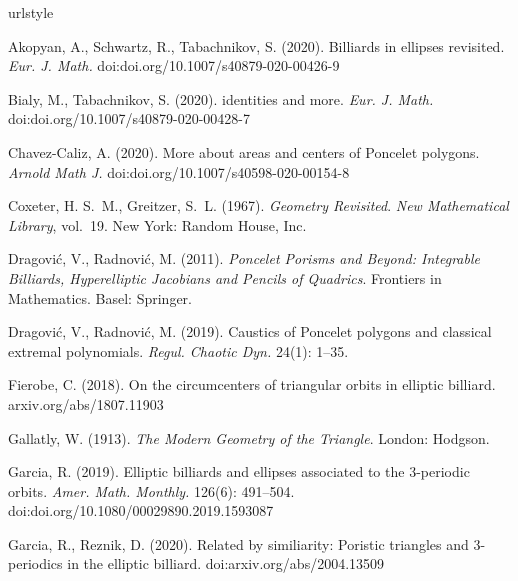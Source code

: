 \documentclass{amsart}
\theoremstyle{definition}
\begin{document}


\begin{thebibliography}{10}
\expandafter\ifx\csname urlstyle\endcsname\relax
 \providecommand{\url}[1]{doi:\discretionary{}{}{}#1}\else
 \providecommand{\url}{doi:\discretionary{}{}{}\begingroup
  \urlstyle{rm}\Url}\fi

Akopyan, A., Schwartz, R., Tabachnikov, S. (2020).
\newblock Billiards in ellipses revisited.
\newblock \emph{Eur. J. Math.}
\newblock \url{doi.org/10.1007/s40879-020-00426-9}

Bialy, M., Tabachnikov, S. (2020).
 identities and more.
\newblock \emph{Eur. J. Math.}
\newblock \url{doi.org/10.1007/s40879-020-00428-7}

Chavez-Caliz, A. (2020).
\newblock More about areas and centers of {P}oncelet polygons.
\newblock \emph{Arnold Math J.}
\newblock \url{doi.org/10.1007/s40598-020-00154-8}

Coxeter, H. S.~M., Greitzer, S.~L. (1967).
\newblock \emph{Geometry Revisited}. \emph{New Mathematical
  Library}, vol.~19.
\newblock New York: Random House, Inc.

Dragovi\'{c}, V., Radnovi\'{c}, M. (2011).
\newblock \emph{{P}oncelet Porisms and Beyond: Integrable Billiards,
  Hyperelliptic Jacobians and Pencils of Quadrics}.
\newblock Frontiers in Mathematics. Basel: Springer.

Dragovi\'{c}, V., Radnovi\'{c}, M. (2019).
\newblock Caustics of {P}oncelet polygons and classical extremal polynomials.
\newblock \emph{Regul. Chaotic Dyn.} 24(1): 1--35.

Fierobe, C. (2018).
\newblock On the circumcenters of triangular orbits in elliptic billiard.
\newblock arxiv.org/abs/1807.11903

Gallatly, W. (1913).
\newblock \emph{The Modern Geometry of the Triangle}.
\newblock London: Hodgson.

Garcia, R. (2019).
\newblock Elliptic billiards and ellipses associated to the 3-periodic orbits.
\newblock \emph{Amer. Math. Monthly.} 126(6): 491--504.
\newblock \url{doi.org/10.1080/00029890.2019.1593087}

Garcia, R., Reznik, D. (2020).
\newblock Related by similiarity: Poristic triangles and 3-periodics in the
  elliptic billiard.
\newblock \url{arxiv.org/abs/2004.13509}


\end{thebibliography}
\end{document}
